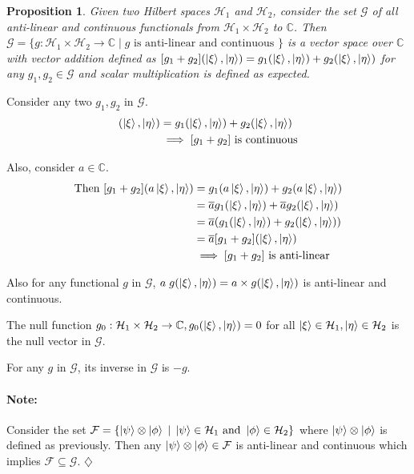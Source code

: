 \documentclass[12pt,twoside,fleqn]{report}
\makeatletter
\theoremstyle{thmstyle}
\renewenvironment{proof}[1][\proofname]{\par
\pushQED{\qed}%
\normalfont \topsep6\p@\@plus6\p@\relax
\trivlist
\item[\hskip\labelsep\itshape#1\@addpunct{.}]\mbox{}\par\nobreak\ignorespaces
}{%
    \popQED\endtrivlist\@endpefalse
    }
\newtheorem{prop}{Proposition}[chapter]
\newenvironment{note}{\paragraph{\textbf{Note:}}}{\hfill\ensuremath{\diamondsuit}}
\makeatother
\begin{document}
\begin{prop}
    Given two Hilbert spaces $\mathcal{H}_1$ and $\mathcal{H}_2$, consider the set $\mathcal{G}$ of all anti-linear and continuous functionals from $\mathcal{H}_1 \times \mathcal{H}_2$ to $\mathbb{C}$.
    Then $\mathcal{G} = \{ g: \mathcal{H}_1 \times \mathcal{H}_2 \to \mathbb{C} \; | \; g \text{ is anti-linear and continuous } \}$ is a vector space over $\mathbb{C}$ with vector addition defined as $[ g_1 + g_2] (\ket{\xi}, \ket{\eta}) = g_1(\ket{\xi}, \ket{\eta}) + g_2(\ket{\xi}, \ket{\eta})$ for any $g_1, g_2 \in \mathcal{G}$ and scalar multiplication is defined as expected.
\end{prop}
\begin{proof}

    Consider any two $g_1, g_2$ in $\mathcal{G}$.
    \begin{align*}
        [g_1 + g_2](\ket\xi, \ket\eta) & = g_1(\ket\xi, \ket\eta) + g_2(\ket\xi, \ket\eta)
        \\ & \implies [g_1 + g_2] \text{ is continuous}
    \end{align*}

    Also, consider $a \in \mathbb{C}$. 
    \begin{align*}
        \text{Then }[g_1 + g_2](a \ket\xi, \ket\eta) & = g_1(a \ket\xi, \ket\eta) + g_2(a \ket\xi, \ket\eta)
        \\ & = \overline{a} g_1(\ket\xi, \ket\eta) + \overline{a} g_2(\ket\xi, \ket\eta) 
        \\ & = \overline{a} (g_1(\ket\xi, \ket\eta) + g_2(\ket\xi,\ket\eta))
        \\ & = \overline{a}[g_1 + g_2](\ket\xi, \ket\eta)
        \\ & \implies [g_1 + g_2] \text{ is anti-linear}
    \end{align*}

    Also for any functional $g$ in $\mathcal{G}$, $a \; g(\ket\xi, \ket\eta) = a \times g(\ket\xi, \ket\eta)$ is anti-linear and continuous.

    The null function $g_0 : \mathcal{H}_1 \times \mathcal{H}_2 \to \mathbb{C}, g_0(\ket\xi, \ket\eta) = 0$ for all $\ket\xi \in \mathcal{H}_1, \ket\eta \in \mathcal{H}_2$ is the null vector in $\mathcal{G}$.

    For any $g$ in $\mathcal{G}$, its inverse in $\mathcal{G}$ is $-g$.
\end{proof}

\begin{note}
    Consider the set $\mathcal{F} = \{ \ket\psi \otimes \ket\phi \; | \; \ket\psi \in \mathcal{H}_1 \text{ and } \ket\phi \in \mathcal{H}_2 \}$ where $\ket\psi \otimes \ket\phi$ is defined as previously.
    Then any $\ket\psi \otimes \ket\phi \in \mathcal{F}$ is anti-linear and continuous which implies $\mathcal{F} \subseteq \mathcal{G}$.
\end{note}
\end{document}
